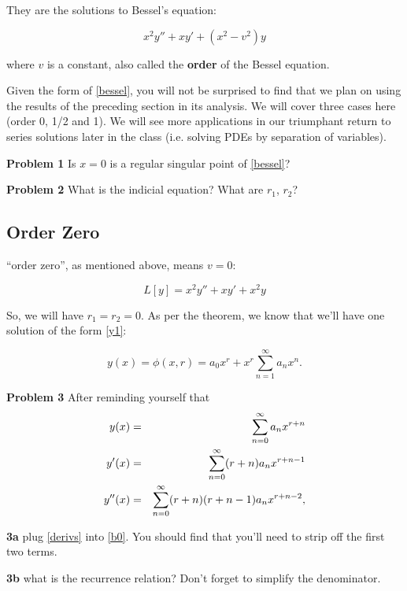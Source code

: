 \documentclass[12pt]{article}
\begin{document}
They are the solutions to Bessel's equation:

\begin{equation}
  \label{bessel}
  x^2y'' + xy' + (x^2-v^2)y
\end{equation}

where $v$ is a constant, also called the \textbf{order} of the Bessel equation.

Given the form of \eqref{bessel}, you will not be surprised to find
that we plan on using the results of the preceding section in its
analysis. We will cover three cases here (order 0, 1/2 and 1). We will
see more applications in our triumphant return to series solutions
later in the class (i.e. solving PDEs by separation of variables).

\textbf{Problem 1} Is $x=0$ is a regular singular point of \eqref{bessel}?
\vskip2in

\textbf{Problem 2} What is the indicial equation? What are $r_1$, $r_2$?
\vskip2in
\subsection{Order Zero}
``order zero'', as mentioned above, means $v=0$:


\begin{equation}
  \label{b0}
  L[y] = x^2y'' + xy' + x^2y
\end{equation}


So, we will have $r_1=r_2=0$. As per the theorem, we know that we'll
have one solution of the form \eqref{y1}:

\begin{equation*}
  y(x) = \phi(x,r) = a_0x^{r} + x^r\sum_{n=1}^{\infty}a_nx^n.
\end{equation*}

\textbf{Problem 3}
After reminding yourself that
\begin{eqnarray}
  y(x) &=& \sum_{n=0}^{\infty}a_nx^{r+n} \notag\\
  y'(x) &=& \sum_{n=0}^{\infty}(r+n)a_nx^{r+n-1} \notag\\
  \label{derivs}
  y''(x) &=& \sum_{n=0}^{\infty}(r+n)(r+n-1)a_nx^{r+n-2},
\end{eqnarray}

\textbf{3a} plug \eqref{derivs} into \eqref{b0}. You should find that you'll need
to strip off the first two terms.
\vskip2in

\textbf{3b} what is the recurrence relation? Don't forget to simplify the denominator.
\vskip1in
\end{document}
